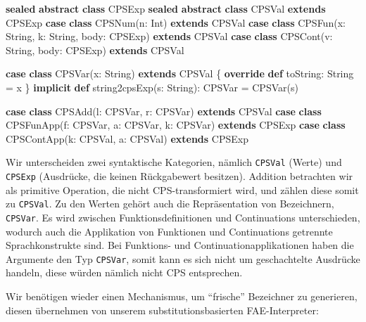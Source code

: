 \documentclass[]{article}
\newenvironment{Shaded}{}{}
\newcommand{\FunctionTok}[1]{\textcolor[rgb]{0.02,0.16,0.49}{#1}}
\newcommand{\KeywordTok}[1]{\textcolor[rgb]{0.00,0.44,0.13}{\textbf{#1}}}
\newcommand{\NormalTok}[1]{#1}
\begin{document}
\begin{Shaded}
\begin{Highlighting}[]
\KeywordTok{sealed} \KeywordTok{abstract} \KeywordTok{class}\NormalTok{ CPSExp}
\KeywordTok{sealed} \KeywordTok{abstract} \KeywordTok{class}\NormalTok{ CPSVal }\KeywordTok{extends}\NormalTok{ CPSExp}
\KeywordTok{case} \KeywordTok{class} \FunctionTok{CPSNum}\NormalTok{(n: Int) }\KeywordTok{extends}\NormalTok{ CPSVal}
\KeywordTok{case} \KeywordTok{class} \FunctionTok{CPSFun}\NormalTok{(x: String, k: String, body: CPSExp) }\KeywordTok{extends}\NormalTok{ CPSVal}
\KeywordTok{case} \KeywordTok{class} \FunctionTok{CPSCont}\NormalTok{(v: String, body: CPSExp) }\KeywordTok{extends}\NormalTok{ CPSVal}

\KeywordTok{case} \KeywordTok{class} \FunctionTok{CPSVar}\NormalTok{(x: String) }\KeywordTok{extends}\NormalTok{ CPSVal \{ }\KeywordTok{override} \KeywordTok{def}\NormalTok{ toString: String = x \}}
\KeywordTok{implicit} \KeywordTok{def} \FunctionTok{string2cpsExp}\NormalTok{(s: String): CPSVar = }\FunctionTok{CPSVar}\NormalTok{(s)}

\KeywordTok{case} \KeywordTok{class} \FunctionTok{CPSAdd}\NormalTok{(l: CPSVar, r: CPSVar) }\KeywordTok{extends}\NormalTok{ CPSVal}
\KeywordTok{case} \KeywordTok{class} \FunctionTok{CPSFunApp}\NormalTok{(f: CPSVar, a: CPSVar, k: CPSVar) }\KeywordTok{extends}\NormalTok{ CPSExp}
\KeywordTok{case} \KeywordTok{class} \FunctionTok{CPSContApp}\NormalTok{(k: CPSVal, a: CPSVal) }\KeywordTok{extends}\NormalTok{ CPSExp}

\end{Highlighting}
\end{Shaded}

Wir unterscheiden zwei syntaktische Kategorien, nämlich \texttt{CPSVal}
(Werte) und \texttt{CPSExp} (Ausdrücke, die keinen Rückgabewert
besitzen). Addition betrachten wir als primitive Operation, die nicht
CPS-transformiert wird, und zählen diese somit zu \texttt{CPSVal}. Zu
den Werten gehört auch die Repräsentation von Bezeichnern,
\texttt{CPSVar}. Es wird zwischen Funktionsdefinitionen und
Continuations unterschieden, wodurch auch die Applikation von Funktionen
und Continuations getrennte Sprachkonstrukte sind. Bei Funktions- und
Continuationapplikationen haben die Argumente den Typ \texttt{CPSVar},
somit kann es sich nicht um geschachtelte Ausdrücke handeln, diese
würden nämlich nicht CPS entsprechen.

Wir benötigen wieder einen Mechanismus, um ``frische'' Bezeichner zu
generieren, diesen übernehmen von unserem substitutionsbasierten
FAE-Interpreter:
\end{document}
